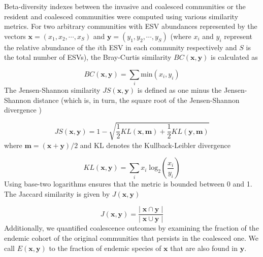 \documentclass[a4paper,10pt]{article}
\begin{document}
Beta-diversity indexes between the invasive and coalesced communities
or the resident and coalesced communities were computed using various
similarity metrics. For two arbitrary communities with
ESV abundances represented by the vectors
$\mathbf{x} = \left( x_1, x_2, \cdots, x_S \right)$
and
$\mathbf{y} = \left( y_1, y_2, \cdots, y_S \right)$
(where $x_i$ and $y_i$ represent the relative abundance of the $i$th ESV in
each community respectively and $S$ is the total number of ESVs), the Bray-Curtis
similarity $BC \left( \mathbf{x}, \mathbf{y} \right)$ is calculated as
\cite{Bray1957}

\begin{equation}
BC \left( \mathbf{x}, \mathbf{y} \right) = 
\sum_i \mathrm{min} \left( x_i , y_i \right)
\label{eq:bray-curtis}
\end{equation}
%
The Jensen-Shannon similarity
$JS \left( \mathbf{x}, \mathbf{y} \right)$
is defined as one minus the Jensen-Shannon distance (which is, in turn,
the square root of the Jensen-Shannon divergence \cite{Lin1991})

\begin{equation}
JS \left( \mathbf{x}, \mathbf{y} \right) = 
1 - \sqrt{\frac{1}{2}KL \left( \mathbf{x}, \mathbf{m} \right) +
\frac{1}{2}KL \left( \mathbf{y}, \mathbf{m} \right)}
\label{eq:jensen-shannon}
\end{equation}
%
where $\mathbf{m} = \left( \mathbf{x} + \mathbf{y} \right)/2$ and KL denotes the
Kullback-Leibler divergence \cite{Kullback1951}

\begin{equation}
KL \left( \mathbf{x}, \mathbf{y} \right) = 
\sum_i x_i \; \mathrm{log_2} \left( \frac{x_i}{y_i} \right)
\label{eq:kullback-leibler}
\end{equation}
%
Using base-two logarithms ensures that the metric is bounded between 0 and 1.
The Jaccard similarity is given by
$J \left( \mathbf{x}, \mathbf{y} \right)$ \cite{Jaccard1912}

\begin{equation}
J \left( \mathbf{x}, \mathbf{y} \right) = 
\frac{\left|\; \mathbf{x} \cap \mathbf{y} \;\right|}
{\left|\; \mathbf{x} \cup \mathbf{y} \;\right|}
\label{eq:jaccard}
\end{equation}
%
Additionally, we quantified coalescence outcomes by examining the fraction of the endemic
cohort of the original communities that persists in the coalesced one. We call
$E \left( \mathbf{x}, \mathbf{y} \right)$ to the fraction of endemic species of
$\mathbf{x}$ that are also found in $\mathbf{y}$.
\end{document}
